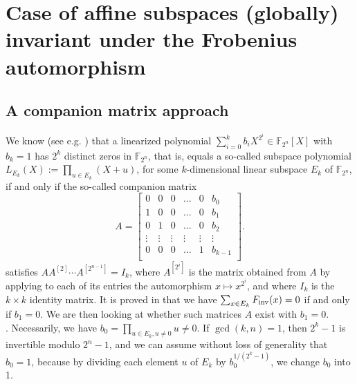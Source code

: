 \documentclass{amsart}
\numberwithin{equation}{section}
\theoremstyle{definition}
\newcommand{\fin}{F_{\text{\rm inv}}}
\begin{document}

\section{Case of affine subspaces (globally) invariant under the Frobenius automorphism}\label{5.3.4} 

\subsection{A companion matrix approach}\label{spp}
We know (see e.g. \cite{CMPZ,McGS}) that a linearized polynomial $\sum_{i=0}^k b_iX^{2^{i}}\in \mathbb F_{2^n}[X]$ with $b_k=1$ has $2^k$ distinct zeros in $\mathbb{F}_{2^n}$, that is, equals a so-called subspace polynomial $L_{E_k}(X):=\prod_{u\in E_k}(X+u)$, for some $k$-dimensional linear subspace $E_k$ of $\mathbb F_{2^n}$, if and only if the so-called companion matrix 
\begin{equation}\label{defA}A= 
\left[\begin{array}{cccccc}
0&0 & 0 & \ldots & 0&b_{0}\\
 1 &0& 0 & \ldots &0& b_{1}\\
0&  1 & 0 & \ldots &0& b_{2}\\
 \vdots& \vdots&\vdots& \vdots& \vdots& \vdots\\
 0&  0 & 0 & \ldots &1& b_{k-1}\\
 \end{array}\right].
\end{equation} 
satisfies $AA^{[2]}\cdots A^{[2^{n-1}]}=I_k$, where $A^{[2^i]}$ is the matrix obtained from $A$ by applying to each of its entries
the automorphism $x\mapsto x^{2^i}$, and where $I_k$ is the $k\times k$ identity matrix. It is proved in \cite{Carlet-0,Carlet-pre} that we have $\sum_{x\in E_k}\fin(x)=0$ if and only if $b_1=0$. We are then looking at whether such matrices $A$ exist with $b_{1}=0$. \\

. Necessarily, we have $b_{0}=\prod_{u\in E_k, u\neq 0}u\neq 0$. If $\gcd(k,n)=1$, then $2^k-1$ is invertible modulo $2^n-1$, and we can assume without loss of generality that $b_{0}=1$, because by dividing each element $u$ of $E_k$ by $ b_{0}^{1/(2^k-1)}$, we change $b_{0}$ into 1. %
\end{document}
